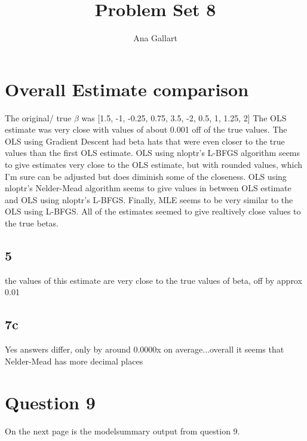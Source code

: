 \documentclass{article}
\title{Problem Set 8}
\author{Ana Gallart}
\begin{document}
\maketitle

\section{Overall Estimate comparison}
The original/ true $\beta$ was [1.5, -1, -0.25, 0.75, 3.5, -2, 0.5, 1, 1.25, 2]
The OLS estimate was very close with values of about  0.001 off of the true values. The OLS using Gradient Descent had beta hats that were even closer to the true values than the first OLS estimate. OLS using nloptr's L-BFGS algorithm seems to give estimates very close to the OLS estimate, but with rounded values, which I'm sure can be adjusted but does diminish some of the closeness. OLS using nloptr's Nelder-Mead algorithm seems to give values in between OLS estimate and OLS using nloptr's L-BFGS. Finally, MLE seems to be very similar to the OLS using L-BFGS. All of the estimates seemed to give realtively close values to the true betas.


\subsection{5}
the values of this estimate are very close to the true values of beta, off by approx 0.01

\subsection{7c}
Yes answers differ, only by around 0.0000x on average...overall it seems that Nelder-Mead has more decimal places


\section{Question 9}
On the next page is the modelsummary output from question 9.
\end{document}
